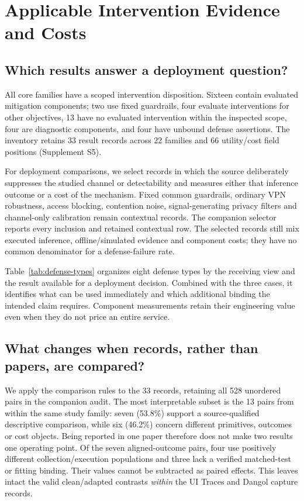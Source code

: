 \section{Applicable Intervention Evidence and Costs}\label{sec:defenses}
\subsection{Which results answer a deployment question?}
All \FinalCore{} core families have a scoped intervention disposition. Sixteen contain evaluated mitigation components; two use fixed guardrails, four evaluate interventions for other objectives, 13 have no evaluated intervention within the inspected scope, four are diagnostic components, and four have unbound defense assertions. The inventory retains 33 result records across 22 families and 66 utility/cost field positions (Supplement S5).

For deployment comparisons, we select records in which the source deliberately suppresses the studied channel or detectability and measures either that inference outcome or a cost of the mechanism. Fixed common guardrails, ordinary VPN robustness, access blocking, contention noise, signal-generating privacy filters and channel-only calibration remain contextual records. The companion selector reports every inclusion and retained contextual row. The selected records still mix executed inference, offline/simulated evidence and component costs; they have no common denominator for a defense-failure rate.

Table~\ref{tab:defense-types} organizes eight defense types by the receiving view and the result available for a deployment decision. Combined with the three cases, it identifies what can be used immediately and which additional binding the intended claim requires. Component measurements retain their engineering value even when they do not price an entire service.


\subsection{What changes when records, rather than papers, are compared?}
We apply the comparison rules to the 33 records, retaining all 528 unordered pairs in the companion audit. The most interpretable subset is the 13 pairs from within the same study family: seven (53.8\%) support a source-qualified descriptive comparison, while six (46.2\%) concern different primitives, outcomes or cost objects. Being reported in one paper therefore does not make two results one operating point. Of the seven aligned-outcome pairs, four use positively different collection/execution populations and three lack a verified matched-test or fitting binding. Their values cannot be subtracted as paired effects. This leaves intact the valid clean/adapted contrasts \emph{within} the UI Traces and Dangol capture records.

